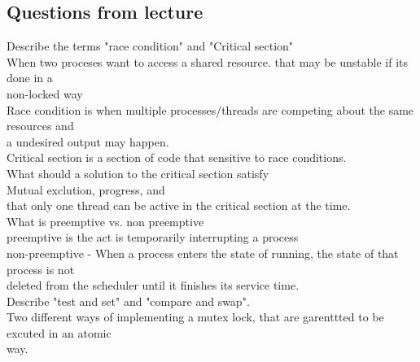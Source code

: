\documentclass[a4paper,10pt,titlepage]{report}
\begin{document}
\subsection{Questions from lecture}

Describe the terms "race condition" and "Critical section"\\

\hspace{10mm} When two proceses want to access a shared resource. that may be unstable if its done in a \\ \hspace{10mm} non-locked way\\
\hspace{10mm} 
Race condition is when multiple processes/threads are competing about the same resources and \\ \hspace{10mm}  a undesired output may happen. \\


\hspace{10mm}  Critical section is a section of code that sensitive to race conditions.\\

What should a solution to the critical section satisfy \\
\hspace{10mm}  Mutual exclution, progress, and \\
\hspace{10mm}  that only one thread can be active in the critical section at the time. \\

What is preemptive vs. non preemptive \\

\hspace{10mm}  preemptive is the act is  temporarily interrupting a process\\

\hspace{10mm}  non-preemptive -  When a process enters the state of running, the state of that process is not \\ \hspace{10mm} deleted from the scheduler until it finishes its service time.\\

Describe "test and set" and "compare and swap". \\

\hspace{10mm}  Two different ways of implementing a mutex lock, that are garenttted to be excuted in an atomic \\ \hspace{10mm} way.\\
\end{document}
